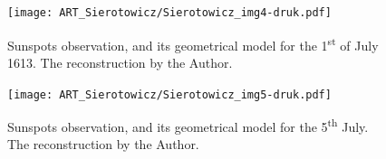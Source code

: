 \begin{artengenv}
\begin{figure}[h]
	\centering
	\texttt{[image: ART\_Sierotowicz/Sierotowicz\_img4-druk.pdf]} 
	\caption{Sunspots observation, and its geometrical model for the 1\textsuperscript{st} of July 1613. The reconstruction
		by the Author.}
	\label{sier-fig4}
\end{figure}

\begin{figure}[h]
	\centering
	\texttt{[image: ART\_Sierotowicz/Sierotowicz\_img5-druk.pdf]} 
	\caption{Sunspots observation, and its geometrical model for the 5\textsuperscript{th} July. The reconstruction by the
		Author.}
	\label{sier-fig5}
\end{figure}







\end{artengenv}